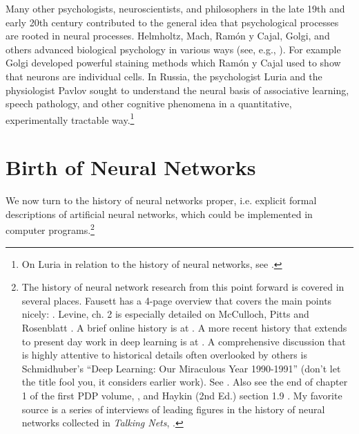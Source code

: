 Many other psychologists, neuroscientists, and philosophers in the late 19th and early 20th century contributed to the general idea that psychological processes are rooted in neural processes. Helmholtz, Mach, Ram{\'o}n y Cajal, Golgi, and others advanced biological psychology in various ways (see, e.g., \cite{boring1929history}). For example Golgi developed powerful staining methods which Ram{\'o}n y Cajal used to show that neurons are individual cells. In Russia, the psychologist Luria and the physiologist Pavlov sought to understand the neural basis of associative learning, speech pathology, and other cognitive phenomena in a quantitative, experimentally tractable way.\footnote{On Luria in relation to the history of neural networks, see \cite[p.~41]{rumelhart1986parallel}.}

\section{Birth of Neural Networks}

We now turn to the history of neural networks proper, i.e. explicit formal descriptions of artificial neural networks, which could be implemented in computer programs.\footnote{The history of neural network research from this point forward is covered in several places. Fausett has a 4-page overview that covers the main points nicely: \cite[pp.~22--26]{fausett1994fundamentals}. Levine, ch. 2 is especially detailed on McCulloch, Pitts and Rosenblatt \cite{levine2000introduction}. A brief online history is at . A more recent history that extends to present day work in deep learning is at . A comprehensive discussion that is highly attentive to historical details often overlooked by others is Schmidhuber's ``Deep Learning: Our Miraculous Year 1990-1991'' \cite{schmidhuber2020deep} (don't let the title fool you, it considers earlier work). See .  Also see the end of chapter 1 of the first PDP volume, \cite{rumelhart1986parallel}, and Haykin (2nd Ed.) section 1.9 \cite{haykin1998neural}. My favorite source is a series of interviews of leading figures in the history of neural networks collected in \emph{Talking Nets}, \cite{anderson2000talking}.}

